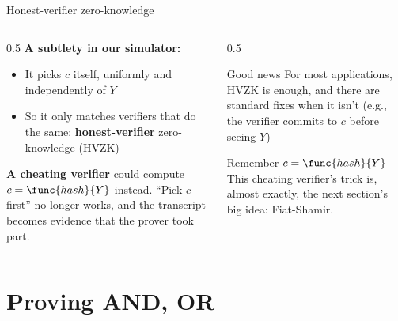 \ifdefined\PRESENTATION\else\PassOptionsToClass{handout}{beamer}\fi\documentclass[aspectratio=169, lualatex]{beamer}
\begin{document}
\begin{frame}{Honest-verifier zero-knowledge}
	\begin{columns}[c]
		\begin{column}{0.5\textwidth}
			\textbf{A subtlety in our simulator:}
			\begin{itemize}
				\item It picks $c$ itself, uniformly and independently of $Y$
				\item So it only matches verifiers that do the same: \textbf{honest-verifier} zero-knowledge (HVZK)
			\end{itemize}
			\textbf{A cheating verifier} could compute $c = \func{hash}{Y}$ instead. ``Pick $c$ first'' no longer works, and the transcript becomes evidence that the prover took part.
		\end{column}
		\begin{column}{0.5\textwidth}
			\begin{exampleblock}{Good news}
				For most applications, HVZK is enough, and there are standard fixes when it isn't (e.g., the verifier commits to $c$ before seeing $Y$)
			\end{exampleblock}
			\begin{alertblock}{Remember $c = \func{hash}{Y}$}
				This cheating verifier's trick is, almost exactly, the next section's big idea: Fiat-Shamir.
			\end{alertblock}
		\end{column}
	\end{columns}
\end{frame}

\section{Proving AND, OR}
\end{document}
